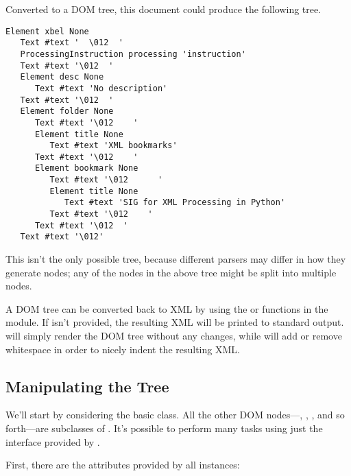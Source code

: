 \documentclass{howto}
\begin{document}
Converted to a DOM tree, this document could produce the following
tree.   

\begin{verbatim}
Element xbel None
   Text #text '  \012  '
   ProcessingInstruction processing 'instruction'
   Text #text '\012  '
   Element desc None
      Text #text 'No description'
   Text #text '\012  '
   Element folder None
      Text #text '\012    '
      Element title None
         Text #text 'XML bookmarks'
      Text #text '\012    '
      Element bookmark None
         Text #text '\012      '
         Element title None
            Text #text 'SIG for XML Processing in Python'
         Text #text '\012    '
      Text #text '\012  '
   Text #text '\012'
\end{verbatim}

This isn't the only possible tree, because different parsers may
differ in how they generate  nodes; any of the
 nodes in the above tree might be split into multiple
nodes.  

A DOM tree can be converted back to XML by using the
 or
 functions in the
 module.  If  isn't provided, the resulting
XML will be printed to standard output.   will simply
render the DOM tree without any changes, while  will
add or remove whitespace in order to nicely indent the resulting XML.


\subsection{Manipulating the Tree}

We'll start by considering the basic  class.  All the
other DOM nodes---, , ,
and so forth---are subclasses of .  It's possible to
perform many tasks using just the interface provided by .

First, there are the attributes provided by all  instances:
\end{document}
